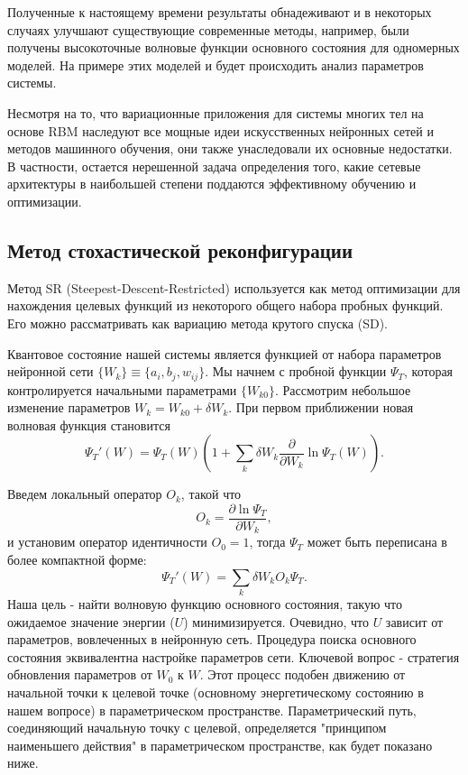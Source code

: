     Полученные к настоящему времени результаты обнадеживают и в некоторых случаях улучшают существующие современные методы, например, были получены высокоточные волновые функции основного состояния для одномерных моделей. На примере этих моделей и будет происходить анализ параметров системы. 
    
    Несмотря на то, что вариационные приложения для системы многих тел на основе RBM наследуют все мощные идеи искусственных нейронных сетей и методов машинного обучения, они также унаследовали их основные недостатки. В частности, остается нерешенной задача определения того, какие сетевые архитектуры в наибольшей степени поддаются эффективному обучению и оптимизации. 

\subsection{Метод стохастической реконфигурации}
    \vspace{0.5cm}
    
    Метод SR (Steepest-Descent-Restricted) используется как метод оптимизации для нахождения целевых функций из некоторого общего набора пробных функций. Его можно рассматривать как вариацию метода крутого спуска (SD). 
    
    Квантовое состояние нашей системы является функцией от набора параметров нейронной сети $\{W_k\} \equiv \{a_i, b_j, w_{ij}\}$. Мы начнем с пробной функции $\Psi_T$, которая контролируется начальными параметрами $\{W_{k0}\}$. Рассмотрим небольшое изменение параметров $W_k = W_{k0} + \delta W_k$. При первом приближении новая волновая функция становится
    \[
        \Psi_T'(W) = \Psi_T(W) \left(1 + \sum_{k} \delta W_k \frac{\partial}{\partial W_k} \ln \Psi_T(W) \right).
    \]
    
    Введем локальный оператор $O_k$, такой что
    \[
    O_k = \frac{\partial \ln \Psi_T}{\partial W_k},
    \]
    и установим оператор идентичности $O_0 = 1$, тогда $\Psi_T$ может быть переписана в более компактной форме:
    \[
        \Psi_T'(W) = \sum_{k} \delta W_k O_k \Psi_T.
    \]
    Наша цель - найти волновую функцию основного состояния, такую что ожидаемое значение энергии ($U$) минимизируется. Очевидно, что $U$ зависит от параметров, вовлеченных в нейронную сеть. Процедура поиска основного состояния эквивалентна настройке параметров сети. Ключевой вопрос - стратегия обновления параметров от $W_0$ к $W$. Этот процесс подобен движению от начальной точки к целевой точке (основному энергетическому состоянию в нашем вопросе) в параметрическом пространстве. Параметрический путь, соединяющий начальную точку с целевой, определяется "принципом наименьшего действия" в параметрическом пространстве, как будет показано ниже.
    
